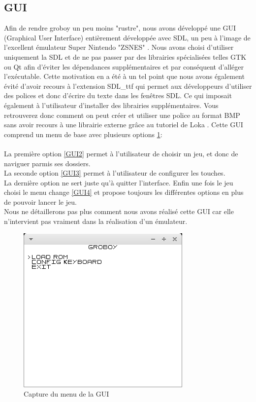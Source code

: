 \documentclass[french]{report}
\begin{document}
\subsection{GUI}
Afin de rendre groboy un peu moins "rustre", nous avons développé une GUI (Graphical User Interface) entièrement développée avec SDL, un peu à l'image de l'excellent émulateur Super Nintendo "ZSNES" \cite{zsnes}. Nous avons choisi d'utiliser uniquement la SDL et de ne pas passer par des librairies spécialisées telles GTK ou Qt afin d'éviter les dépendances supplémentaires et par conséquent d'alléger l'exécutable. Cette motivation en a été à un tel point que nous avons également évité d'avoir recours à l'extension SDL\_ttf qui permet aux développeurs d'utiliser des polices et donc d'écrire du texte dans les fenêtres SDL. Ce qui imposait également à l'utilisateur d'installer des librairies supplémentaires. Vous retrouverez donc comment on peut créer et utiliser une police au format BMP sans avoir recours à une librairie externe grâce au tutoriel de Loka \cite{loka}. Cette GUI comprend un menu de base avec plusieurs options \ref{GUI1}: \\\\ 
La première option \ref{GUI2} permet à l'utilisateur de choisir un jeu, et donc de naviguer parmis ses dossiers.\\
La seconde option \ref{GUI3} permet à l'utilisateur de configurer les touches.\\
La dernière option ne sert juste qu'à quitter l'interface. Enfin une fois le jeu choisi le menu change \ref{GUI4} et propose toujours les différentes options en plus de pouvoir lancer le jeu.\\
Nous ne détaillerons pas plus comment nous avons réalisé cette GUI car elle n'intervient pas vraiment dans la réalisation d'un émulateur.

\begin{figure}[!h]
\centering
\includegraphics[scale=0.5]{images/screenshot_menu.png}
\caption{Capture du menu de la GUI}
\label{GUI1}
\end{figure}
\end{document}
